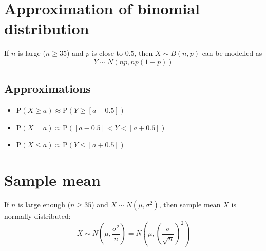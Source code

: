 \section{Approximation of binomial distribution}
If $n$ is large ($n\geq35$) and $p$ is close to $0.5$, then $X \sim B(n,p)$ can be modelled as $$Y \sim N(np, np(1-p))$$
\subsection{Approximations}
\begin{itemize}
	\item $\text{P}(X\geq a)\approx \text{P}(Y\geq [a-0.5])$
	\item $\text{P}(X=a)\approx \text{P}([a-0.5]<Y<[a+0.5])$
	\item $\text{P}(X \leq a)\approx \text{P}(Y\leq [a+0.5])$
\end{itemize}


\section{Sample mean}
If $n$ is large enough ($n\geq35$) and $X\sim N(\mu, \sigma^2)$, then sample mean $\overline{X}$ is 
normally distributed: 
$$\overline{X} \sim N\left(\mu, \frac{\sigma^2}{n}\right)=N\left(\mu, \left(\frac{\sigma}{\sqrt{n}}\right)^2\right)$$